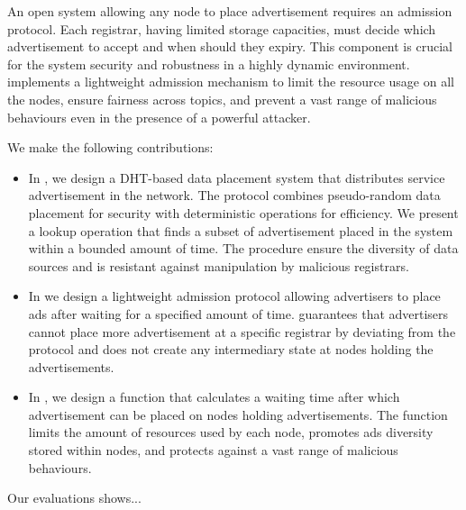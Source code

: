 An open system allowing any node to place advertisement requires an admission protocol. Each registrar, having limited storage capacities, must decide which advertisement to accept and when should they expiry. This component is crucial for the system security and robustness in a highly dynamic environment. \sysname implements a lightweight admission mechanism to limit the resource usage on all the nodes, ensure fairness across topics, and prevent a vast range of malicious behaviours even in the presence of a powerful attacker.

 We make the following contributions:
\begin{itemize}
    \item In , we design a DHT-based data placement system that distributes service advertisement in the network. The protocol combines pseudo-random data placement for security with deterministic operations for efficiency. We present a lookup operation that finds a subset of advertisement placed in the system within a bounded amount of time. The procedure ensure the diversity of data sources and is resistant against manipulation by malicious registrars. 
    \item In  we design a lightweight admission protocol allowing advertisers to place ads after waiting for a specified amount of time. %
    \sysname guarantees that advertisers cannot place more advertisement at a specific registrar by deviating from the protocol %
    and does not create any intermediary state at nodes holding the advertisements.
    \item In , we design a function that calculates a waiting time after which advertisement can be placed on nodes holding advertisements. The function limits the amount of resources used by each node, promotes ads diversity stored within nodes, and protects against a vast range of malicious behaviours. 
\end{itemize}

Our evaluations shows...




